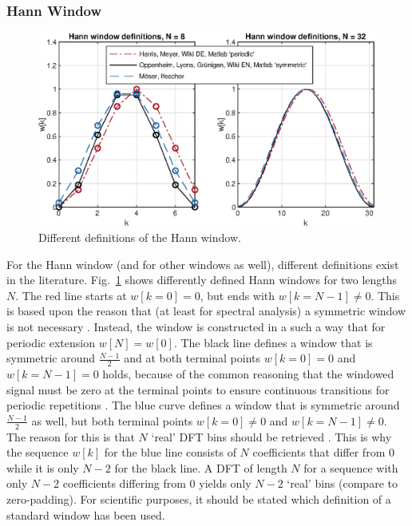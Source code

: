 \documentclass[11pt,a4paper,DIV=12]{scrartcl}
\begin{document}
\subsubsection{Hann Window}
\begin{figure}
		\centering
		\includegraphics[]{graphics/HannDefinitionen}
		\caption{Different definitions of the Hann window.}
		\label{HannDefinitionen}
\end{figure}

For the Hann window (and for other windows as well), different definitions
exist in the literature.
%
Fig.~\ref{HannDefinitionen} shows differently defined Hann windows for two
lengths $N$.
%
The red line starts at $w[k=0]=0$, but ends with $w[k=N-1]\neq0$.
%
This is based upon the reason that (at least for spectral analysis) a symmetric
window is not necessary \cite[p.~52]{Harris1978}.
%
Instead, the window is constructed in a such a way that for periodic extension
$w[N]=w[0]$.
%
The black line defines a window that is symmetric around $\frac{N-1}{2}$ and at
both terminal points $w[k=0]=0$ and $w[k=N-1]=0$ holds, because of the common
reasoning that the windowed signal must be zero at the terminal points to
ensure continuous transitions for periodic repetitions
\cite{Oppenheim2010, Lyons2011}.
%
The blue curve defines a window that is symmetric around $\frac{N-1}{2}$ as well,
but both terminal points $w[k=0]\neq0$ and $w[k=N-1]\neq0$.
%
The reason for this is that $N$ `real' DFT bins should be retrieved
\cite{Moeser2011, Ifeachor2002}.
%
This is why the sequence $w[k]$ for the blue line consists of $N$ coefficients
that differ from 0 while it is only $N-2$ for the black line.
%
A DFT of length $N$ for a sequence with only $N-2$ coefficients differing from
0 yields only $N-2$ `real' bins (compare to zero-padding).
%
For scientific purposes, it should be stated which definition of a standard
window has been used.
\end{document}
